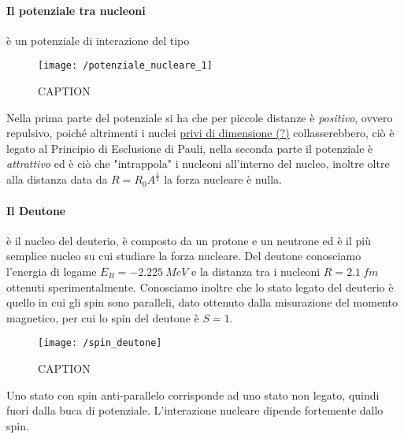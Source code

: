\paragraph{Il potenziale tra nucleoni} è un potenziale di interazione del tipo
\begin{figure}[h]
\centering
\texttt{[image: /potenziale\_nucleare\_1]}
\caption{CAPTION}
\end{figure}
Nella prima parte del potenziale si ha che per piccole distanze è \emph{positivo}, ovvero repulsivo, poiché altrimenti i nuclei \underline{privi di dimensione (?)} collasserebbero, ciò è legato al Principio di Esclusione di Pauli, nella seconda parte il potenziale è \emph{attrattivo} ed è ciò che "intrappola" i nucleoni all'interno del nucleo, inoltre oltre alla distanza data da $R = R_0 A^{\frac{1}{3}}$ la forza nucleare è nulla.

\paragraph{Il Deutone} è il nucleo del deuterio, è composto da un protone e un neutrone ed è il più semplice nucleo su cui studiare la forza nucleare.
Del deutone conosciamo l'energia di legame $E_B = \SI{-2.225}{MeV}$ e la distanza tra i nucleoni $R = \SI{2.1}{fm}$ ottenuti sperimentalmente.
Conosciamo inoltre che lo stato legato del deuterio è quello in cui gli spin sono paralleli, dato ottenuto dalla misurazione del momento magnetico, per cui lo spin del deutone è $S = 1$.
\begin{figure}[h]
\centering
\texttt{[image: /spin\_deutone]}
\caption{CAPTION}
\end{figure}
Uno stato con spin anti-parallelo corrisponde ad uno stato non legato, quindi fuori dalla buca di potenziale.
L'interazione nucleare dipende fortemente dallo spin.

